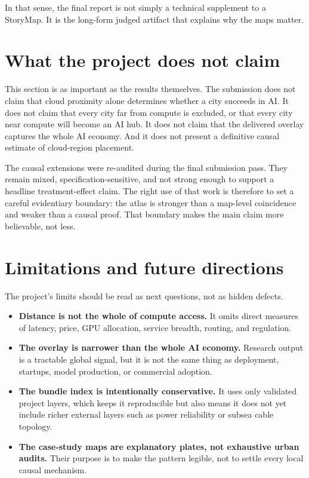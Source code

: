 \documentclass[11pt]{article}
\begin{document}
In that sense, the final report is not simply a technical supplement to a StoryMap. It is the long-form judged artifact that explains why the maps matter.

\section{What the project does not claim}
This section is as important as the results themselves. The submission does not claim that cloud proximity alone determines whether a city succeeds in AI. It does not claim that every city far from compute is excluded, or that every city near compute will become an AI hub. It does not claim that the delivered overlay captures the whole AI economy. And it does not present a definitive causal estimate of cloud-region placement.

The causal extensions were re-audited during the final submission pass. They remain mixed, specification-sensitive, and not strong enough to support a headline treatment-effect claim. The right use of that work is therefore to set a careful evidentiary boundary: the atlas is stronger than a map-level coincidence and weaker than a causal proof. That boundary makes the main claim more believable, not less.

\section{Limitations and future directions}
The project’s limits should be read as next questions, not as hidden defects.
\begin{itemize}[leftmargin=*]
  \item \textbf{Distance is not the whole of compute access.} It omits direct measures of latency, price, GPU allocation, service breadth, routing, and regulation.
  \item \textbf{The overlay is narrower than the whole AI economy.} Research output is a tractable global signal, but it is not the same thing as deployment, startups, model production, or commercial adoption.
  \item \textbf{The bundle index is intentionally conservative.} It uses only validated project layers, which keeps it reproducible but also means it does not yet include richer external layers such as power reliability or subsea cable topology.
  \item \textbf{The case-study maps are explanatory plates, not exhaustive urban audits.} Their purpose is to make the pattern legible, not to settle every local causal mechanism.
\end{itemize}
\end{document}

